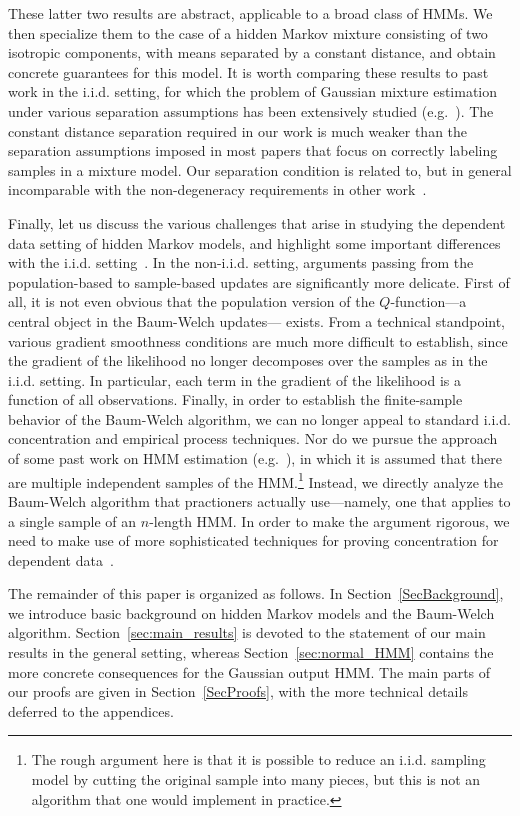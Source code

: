 \documentclass[twoside,11pt]{article}
\newcommand{\numobs}{\ensuremath{n}}
\begin{document}
These latter two results are abstract, applicable to a broad class of
HMMs. We then specialize them to the case of a hidden Markov mixture
consisting of two isotropic components, with means separated by a
constant distance, and obtain concrete guarantees for this model.  It
is worth comparing these results to past work in the i.i.d. setting,
for which the problem of Gaussian mixture estimation under various
separation assumptions has been extensively studied
(e.g.~\cite{dasgupta,vempala,belkin,moitra}). The constant distance
separation required in our work is much weaker than the separation
assumptions imposed in most papers that focus on correctly labeling samples
in a mixture model.  Our separation condition is related to, but in
general incomparable with the non-degeneracy requirements in other
work~\citep{Hsu12, hsumog, moitra}.


Finally, let us discuss the various challenges that arise in studying
the dependent data setting of hidden Markov models, and highlight some
important differences with the
i.i.d. setting~\citep{BalWaiYu14,YiCar15}.  In the non-i.i.d. setting,
arguments passing from the population-based to sample-based updates
are significantly more delicate. First of all, it is not even obvious
that the population version of the $Q$-function---a central object in
the Baum-Welch updates--- exists. From a technical standpoint, various
gradient smoothness conditions are much more difficult to establish,
since the gradient of the likelihood no longer decomposes over the
samples as in the i.i.d. setting. In particular, each term in the
gradient of the likelihood is a function of all observations. Finally,
in order to establish the finite-sample behavior of the Baum-Welch
algorithm, we can no longer appeal to standard i.i.d.  concentration
and empirical process techniques.  Nor do we pursue the approach of
some past work on HMM estimation (e.g.~\cite{Hsu12}), in which it is
assumed that there are multiple independent samples of the
HMM.\footnote{The rough argument here is that it is possible to reduce
  an i.i.d. sampling model by cutting the original sample into many
  pieces, but this is not an algorithm that one would implement in
  practice.} Instead, we directly analyze the Baum-Welch algorithm
that practioners actually use---namely, one that applies to a single
sample of an $\numobs$-length HMM.  In order to make the argument
rigorous, we need to make use of more sophisticated techniques for
proving concentration for dependent data~\citep{Yu94, NobDem93}.

The remainder of this paper is organized as follows.  In
Section~\ref{SecBackground}, we introduce basic background on hidden
Markov models and the Baum-Welch algorithm.
Section~\ref{sec:main_results} is devoted to the statement of our main
results in the general setting, whereas Section~\ref{sec:normal_HMM}
contains the more concrete consequences for the Gaussian output HMM.
The main parts of our proofs are given in Section~\ref{SecProofs},
with the more technical details deferred to the appendices.
\end{document}
